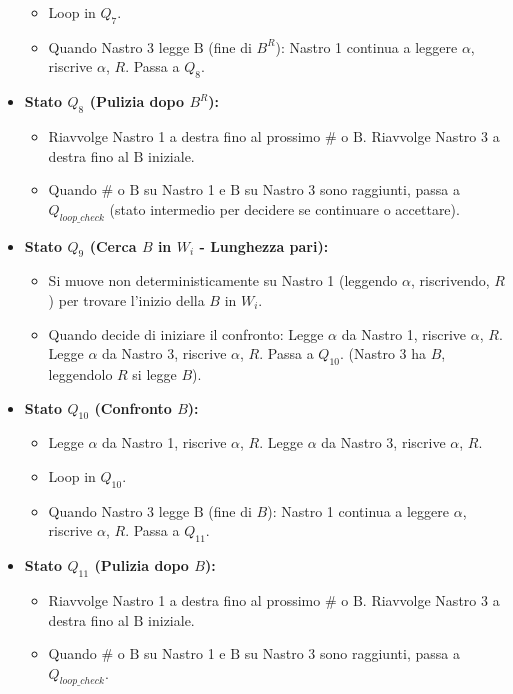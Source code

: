 \documentclass[a4paper, 11pt]{book} %
\theoremstyle{definition}
\newcommand{\B}{\text{B}} %
\begin{document}
\begin{itemize}
\begin{itemize}
            \item Loop in $Q_7$.
            \item Quando Nastro 3 legge $\B$ (fine di $B^R$): Nastro 1 continua a leggere $\alpha$, riscrive $\alpha$, $R$. Passa a $Q_8$.
        \end{itemize}
    \item \textbf{Stato $Q_8$ (Pulizia dopo $B^R$):}
        \begin{itemize}
            \item Riavvolge Nastro 1 a destra fino al prossimo $\#$ o $\B$. Riavvolge Nastro 3 a destra fino al $\B$ iniziale.
            \item Quando $\#$ o $\B$ su Nastro 1 e $\B$ su Nastro 3 sono raggiunti, passa a $Q_{loop\_check}$ (stato intermedio per decidere se continuare o accettare).
        \end{itemize}
    \item \textbf{Stato $Q_9$ (Cerca $B$ in $W_i$ - Lunghezza pari):}
        \begin{itemize}
            \item Si muove non deterministicamente su Nastro 1 (leggendo $\alpha$, riscrivendo, $R$) per trovare l'inizio della $B$ in $W_i$.
            \item Quando decide di iniziare il confronto: Legge $\alpha$ da Nastro 1, riscrive $\alpha$, $R$. Legge $\alpha$ da Nastro 3, riscrive $\alpha$, $R$. Passa a $Q_{10}$.
            (Nastro 3 ha $B$, leggendolo $R$ si legge $B$).
        \end{itemize}
    \item \textbf{Stato $Q_{10}$ (Confronto $B$):}
        \begin{itemize}
            \item Legge $\alpha$ da Nastro 1, riscrive $\alpha$, $R$. Legge $\alpha$ da Nastro 3, riscrive $\alpha$, $R$.
            \item Loop in $Q_{10}$.
            \item Quando Nastro 3 legge $\B$ (fine di $B$): Nastro 1 continua a leggere $\alpha$, riscrive $\alpha$, $R$. Passa a $Q_{11}$.
        \end{itemize}
    \item \textbf{Stato $Q_{11}$ (Pulizia dopo $B$):}
        \begin{itemize}
            \item Riavvolge Nastro 1 a destra fino al prossimo $\#$ o $\B$. Riavvolge Nastro 3 a destra fino al $\B$ iniziale.
            \item Quando $\#$ o $\B$ su Nastro 1 e $\B$ su Nastro 3 sono raggiunti, passa a $Q_{loop\_check}$.

\end{itemize}
\end{itemize}
\end{document}
